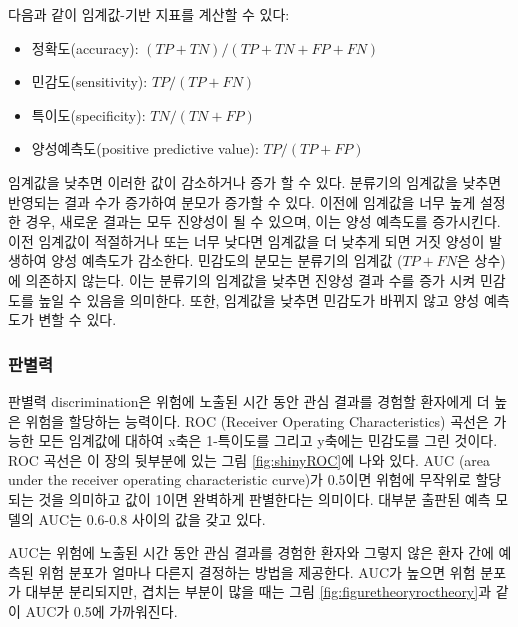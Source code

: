 \documentclass[10.5pt]{book}
\providecommand{\tightlist}{%
  \setlength{\itemsep}{0pt}\setlength{\parskip}{0pt}}
\theoremstyle{definition}
\theoremstyle{definition}
\theoremstyle{definition}
\theoremstyle{remark}
\begin{document}
다음과 같이 임계값-기반 지표를 계산할 수 있다:

\begin{itemize}
\tightlist
\item
  정확도(accuracy): \((TP+TN)/(TP+TN+FP+FN)\)
\item
  민감도(sensitivity): \(TP/(TP+FN)\)
\item
  특이도(specificity): \(TN/(TN+FP)\)
\item
  양성예측도(positive predictive value): \(TP/(TP+FP)\)
\end{itemize}

임계값을 낮추면 이러한 값이 감소하거나 증가 할 수 있다. 분류기의
임계값을 낮추면 반영되는 결과 수가 증가하여 분모가 증가할 수 있다.
이전에 임계값을 너무 높게 설정한 경우, 새로운 결과는 모두 진양성이 될 수
있으며, 이는 양성 예측도를 증가시킨다. 이전 임계값이 적절하거나 또는
너무 낮다면 임계값을 더 낮추게 되면 거짓 양성이 발생하여 양성 예측도가
감소한다. 민감도의 분모는 분류기의 임계값 (\(TP+FN\)은 상수) 에 의존하지
않는다. 이는 분류기의 임계값을 낮추면 진양성 결과 수를 증가 시켜
민감도를 높일 수 있음을 의미한다. 또한, 임계값을 낮추면 민감도가 바뀌지
않고 양성 예측도가 변할 수 있다.

\subsubsection*{판별력}

판별력 discrimination은 위험에 노출된 시간 동안 관심 결과를 경험할
환자에게 더 높은 위험을 할당하는 능력이다. ROC (Receiver Operating
Characteristics) 곡선은 가능한 모든 임계값에 대하여 x축은 1-특이도를
그리고 y축에는 민감도를 그린 것이다. ROC 곡선은 이 장의 뒷부분에 있는
그림 \ref{fig:shinyROC}에 나와 있다. AUC (area under the receiver
operating characteristic curve)가 0.5이면 위험에 무작위로 할당되는 것을
의미하고 값이 1이면 완벽하게 판별한다는 의미이다. 대부분 출판된 예측
모델의 AUC는 0.6-0.8 사이의 값을 갖고 있다.  

AUC는 위험에 노출된 시간 동안 관심 결과를 경험한 환자와 그렇지 않은 환자
간에 예측된 위험 분포가 얼마나 다른지 결정하는 방법을 제공한다. AUC가
높으면 위험 분포가 대부분 분리되지만, 겹치는 부분이 많을 때는 그림
\ref{fig:figuretheoryroctheory}과 같이 AUC가 0.5에 가까워진다.
\end{document}
